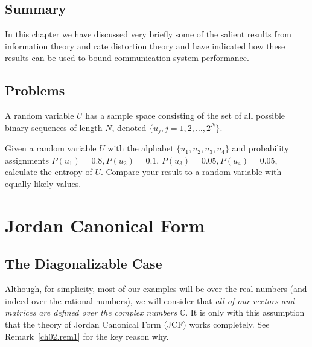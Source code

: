 \documentclass{book}\usepackage[]{graphicx}\usepackage[]{color}
\begin{document}
\section*{Summary}

In this chapter we have discussed very briefly some of the salient
results from information theory and rate distortion theory and have
indicated how these results can be used to bound communication system
performance.


\section*{Problems}
%

\begin{problems}

\item
A random variable $U$ has a sample space consisting of the set
of all possible binary sequences of length $N$, denoted
$\{u_j, j=1, 2, \ldots, 2^N \}$.

\item
Given a random variable $U$ with the alphabet $\{ u_1, u_2, u_3, u_4 \}$
and probability assignments $P(u_1) = 0.8, P(u_2)=0.1$,
$P(u_3) = 0.05, P(u_4)=0.05$, calculate the entropy of $U$.
Compare your result to a random variable with equally likely values.

\end{problems}

\clearpage

    


\chapter{Jordan Canonical Form}
\label{ch02}
%

\section{The Diagonalizable Case}

Although, for simplicity, most of our examples
will be over the real numbers
(and indeed over the rational numbers), we will consider that
\textit{all of our vectors and matrices
are defined over the complex numbers} $\mathbb{C}$.
It is only with this assumption that the
theory of Jordan Canonical Form (JCF) works
%
completely.
See Remark~\ref{ch02.rem1} for the key reason why.
\end{document}
